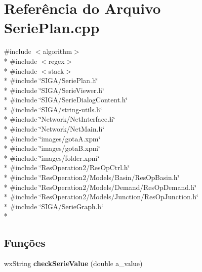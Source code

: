 \section{Referência do Arquivo Serie\+Plan.\+cpp}
\label{_serie_plan_8cpp}
{\ttfamily \#include $<$algorithm$>$}\\*
{\ttfamily \#include $<$regex$>$}\\*
{\ttfamily \#include $<$stack$>$}\\*
{\ttfamily \#include \char`\"{}S\+I\+G\+A/\+Serie\+Plan.\+h\char`\"{}}\\*
{\ttfamily \#include \char`\"{}S\+I\+G\+A/\+Serie\+Viewer.\+h\char`\"{}}\\*
{\ttfamily \#include \char`\"{}S\+I\+G\+A/\+Serie\+Dialog\+Content.\+h\char`\"{}}\\*
{\ttfamily \#include \char`\"{}S\+I\+G\+A/string-\/utils.\+h\char`\"{}}\\*
{\ttfamily \#include \char`\"{}Network/\+Net\+Interface.\+h\char`\"{}}\\*
{\ttfamily \#include \char`\"{}Network/\+Net\+Main.\+h\char`\"{}}\\*
{\ttfamily \#include \char`\"{}images/gota\+A.\+xpm\char`\"{}}\\*
{\ttfamily \#include \char`\"{}images/gota\+B.\+xpm\char`\"{}}\\*
{\ttfamily \#include \char`\"{}images/folder.\+xpm\char`\"{}}\\*
{\ttfamily \#include \char`\"{}Res\+Operation2/\+Res\+Op\+Ctrl.\+h\char`\"{}}\\*
{\ttfamily \#include \char`\"{}Res\+Operation2/\+Models/\+Basin/\+Res\+Op\+Basin.\+h\char`\"{}}\\*
{\ttfamily \#include \char`\"{}Res\+Operation2/\+Models/\+Demand/\+Res\+Op\+Demand.\+h\char`\"{}}\\*
{\ttfamily \#include \char`\"{}Res\+Operation2/\+Models/\+Junction/\+Res\+Op\+Junction.\+h\char`\"{}}\\*
{\ttfamily \#include \char`\"{}S\+I\+G\+A/\+Serie\+Graph.\+h\char`\"{}}\\*
\subsection*{Funções}
\begin{DoxyCompactItemize}
\item 
wx\+String {\bf check\+Serie\+Value} (double a\+\_\+value)
\end{DoxyCompactItemize}



